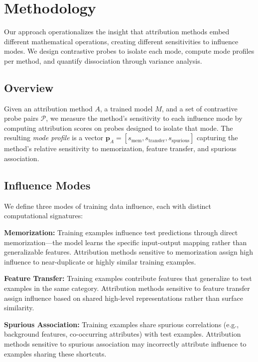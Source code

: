 \section{Methodology}

Our approach operationalizes the insight that attribution methods embed different mathematical operations, creating different sensitivities to influence modes. We design contrastive probes to isolate each mode, compute mode profiles per method, and quantify dissociation through variance analysis.

\subsection{Overview}

Given an attribution method $A$, a trained model $M$, and a set of contrastive probe pairs $\mathcal{P}$, we measure the method's sensitivity to each influence mode by computing attribution scores on probes designed to isolate that mode. The resulting \emph{mode profile} is a vector $\mathbf{p}_A = [s_\text{mem}, s_\text{transfer}, s_\text{spurious}]$ capturing the method's relative sensitivity to memorization, feature transfer, and spurious association.

\subsection{Influence Modes}

We define three modes of training data influence, each with distinct computational signatures:

\textbf{Memorization:} Training examples influence test predictions through direct memorization---the model learns the specific input-output mapping rather than generalizable features. Attribution methods sensitive to memorization assign high influence to near-duplicate or highly similar training examples.

\textbf{Feature Transfer:} Training examples contribute features that generalize to test examples in the same category. Attribution methods sensitive to feature transfer assign influence based on shared high-level representations rather than surface similarity.

\textbf{Spurious Association:} Training examples share spurious correlations (e.g., background features, co-occurring attributes) with test examples. Attribution methods sensitive to spurious association may incorrectly attribute influence to examples sharing these shortcuts.

